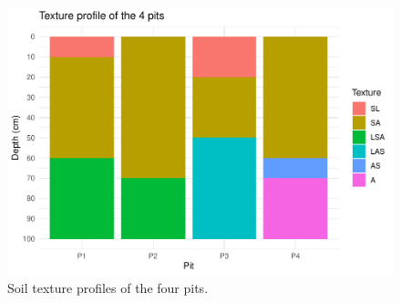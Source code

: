 \documentclass[fleqn,12pt]{latex/stylish_article} %
\begin{document}
\normalsize



\scriptsize

\begin{figure}

{\centering \includegraphics[width=0.8\linewidth]{pedoP16-report_files/figure-latex/pitPlotTextureProfile-1} 

}

\caption{Soil texture profiles of the four pits.}\label{fig:pitPlotTextureProfile}
\end{figure}

\normalsize



\makeatletter

\makeatother


\end{document}
